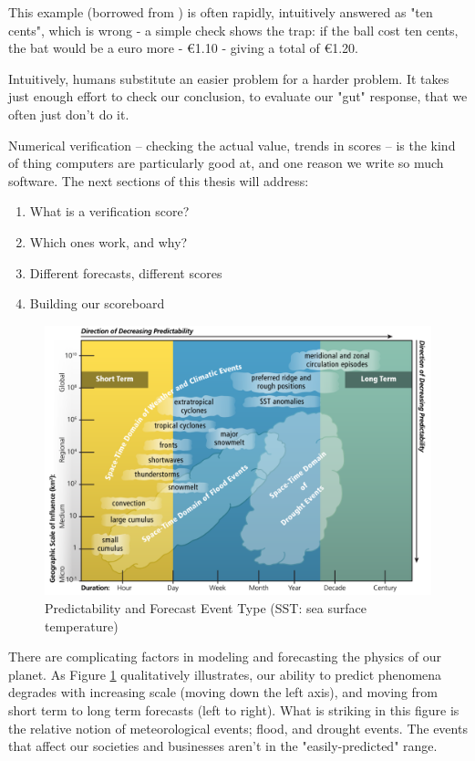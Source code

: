 \documentclass[logos,parttoc,morelanguage=french,morelanguage=german]{orsay-memoire}
\begin{document}
This example (borrowed from \textcite{kahneman2011thinking}) is often rapidly, intuitively answered as "ten cents", which is wrong - a simple check shows the trap: if the ball cost ten cents, the bat would be a euro more - €1.10 - giving a total of €1.20.

Intuitively, humans substitute an easier problem for a harder problem. It takes just enough effort to check our conclusion, to evaluate our "gut" response, that we often just don't do it.

Numerical verification -- checking the actual value, trends in scores -- is the kind of thing computers are particularly good at, and one reason we write so much software. The next sections of this thesis will address:
\begin{enumerate}
\item What is a verification score?
\item Which ones work, and why?
\item Different forecasts, different scores
\item Building our scoreboard
\end{enumerate}

\begin{figure}[hb]
\includegraphics[width=\linewidth]{images/noaaSeasonalForecastProbs.png}
  \caption{Predictability and Forecast Event Type (SST: sea surface temperature) \autocite{jones2015cdwrproceedings}}
  \label{fig:noaa_seasonal_predictability}
\end{figure}

There are complicating factors in modeling and forecasting the physics of our planet. As Figure \ref{fig:noaa_seasonal_predictability} qualitatively illustrates, our ability to predict phenomena degrades with increasing scale (moving down the left axis), and moving from short term to long term forecasts (left to right). What is striking in this figure is the relative notion of meteorological events; flood, and drought events. The events that affect our societies and businesses aren't in the "easily-predicted" range.
\end{document}
